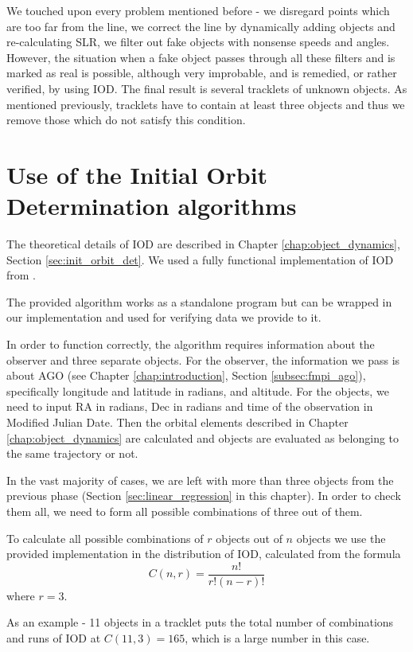 	We touched upon every problem mentioned before - we disregard points which are too far from the line, we correct the line by dynamically adding objects and re-calculating SLR, we filter out fake objects with nonsense speeds and angles. However, the situation when a fake object passes through all these filters and is marked as real is possible, although very improbable, and is remedied, or rather verified, by using IOD. The final result is several tracklets of unknown objects. As mentioned previously, tracklets have to contain at least three objects and thus we remove those which do not satisfy this condition.

\section{Use of the Initial Orbit Determination algorithms}\label{sec:IDO}

	The theoretical details of IOD are described in Chapter \ref{chap:object_dynamics}, Section \ref{sec:init_orbit_det}. We used a fully functional implementation of IOD from \citep{Silha2012id}.

	The provided algorithm works as a standalone program but can be wrapped in our implementation and used for verifying data we provide to it.
	
	 In order to function correctly, the algorithm requires information about the observer and three separate objects. For the observer, the information we pass is about AGO (see Chapter \ref{chap:introduction}, Section \ref{subsec:fmpi_ago}), specifically longitude and latitude in radians, and altitude. For the objects, we need to input RA in radians, Dec in radians and time of the observation in Modified Julian Date. Then the orbital elements described in Chapter \ref{chap:object_dynamics} are calculated and objects are evaluated as belonging to the same trajectory or not.
	 
	 In the vast majority of cases, we are left with more than three objects from the previous phase (Section \ref{sec:linear_regression} in this chapter). In order to check them all, we need to form all possible combinations of three out of them. 
	 	
	 To calculate all possible combinations of $r$ objects out of $n$ objects we use the provided implementation in the distribution of IOD, calculated from the formula $$C(n,r)=\frac{n!}{r!(n-r)!}$$ where $r=3$.
	 
	 As an example - 11 objects in a tracklet puts the total number of combinations and runs of IOD at $C(11,3)=165$, which is a large number in this case. 
	 
